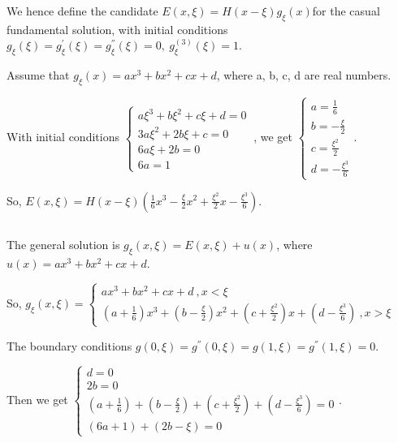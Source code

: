 \documentclass{article}
\begin{document}
We hence define the candidate $E\left(x,\xi{}\right)=H(x-\xi{})g_{\xi{}}(x)$for
the casual fundamental solution, with initial conditions
$g_{\xi{}}\left(\xi{}\right)=g_{\xi{}}^{'}\left(\xi{}\right)=g_{\xi{}}^{''}\left(\xi{}\right)=0,\
g_{\xi{}}^{(3)}\left(\xi{}\right)=1$.

Assume that $g_{\xi{}}\left(x\right)=ax^3+bx^2+cx+d$, where a, b, c, d are real
numbers.

With initial conditions $\left\{\begin{array}{l}a{\xi{}}^3+b{\xi{}}^2+c\xi{}+d=0
\\
3a{\xi{}}^2+2b\xi{}+c=0 \\
6a\xi{}+2b=0 \\
6a=1\end{array}\right.\ $, we get $\left\{\begin{array}{l}a=\frac{1}{6} \\
b=-\frac{\xi{}}{2} \\
c=\frac{{\xi{}}^2}{2} \\
d=-\frac{{\xi{}}^3}{6}\end{array}\right.$.

So,
$E\left(x,\xi{}\right)=H(x-\xi{})(\frac{1}{6}x^3-\frac{\xi{}}{2}x^2+\frac{{\xi{}}^2}{2}x-\frac{{\xi{}}^3}{6})$.
~\\
\subsection{}
The general solution is
$g_{\xi{}}\left(x,\xi{}\right)=E\left(x,\xi{}\right)+u(x)$, where
$u\left(x\right)=ax^3+bx^2+cx+d$.

So, $g_{\xi{}}\left(x,\xi{}\right)=\left\{\begin{array}{l}ax^3+bx^2+cx+d\
,x<\xi{} \\
\left(a+\frac{1}{6}\right)x^3+\left(b-\frac{\xi{}}{2}\right)x^2+\left(c+\frac{{\xi{}}^2}{2}\right)x+\left(d-\frac{{\xi{}}^3}{6}\right)\
,x>\xi{}\end{array}\right.$

The boundary conditions
$g\left(0,\xi{}\right)=g^{''}\left(0,\xi{}\right)=g\left(1,\xi{}\right)=g^{''}\left(1,\xi{}\right)=0$.

Then we get $\left\{\begin{array}{l}d=0 \\
2b=0 \\
\left(a+\frac{1}{6}\right)+\left(b-\frac{\xi{}}{2}\right)+\left(c+\frac{{\xi{}}^2}{2}\right)+\left(d-\frac{{\xi{}}^3}{6}\right)=0
\\
\left(6a+1\right)+(2b-\xi{})=0\end{array}\right.$.
\end{document}

